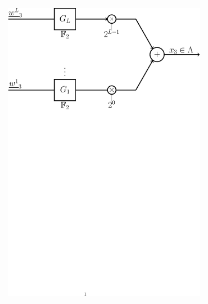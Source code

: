 \documentclass[10pt]{beamer}
\begin{document}
\begin{frame}
\begin{columns}
\begin{column}{0.47\textwidth}
            \begin{figure}
                \includegraphics[width=2in]{lattice_Constr_D1_user2.pdf}
            \end{figure}
        \end{column}
\end{columns}
\end{frame}

%


\end{document}
